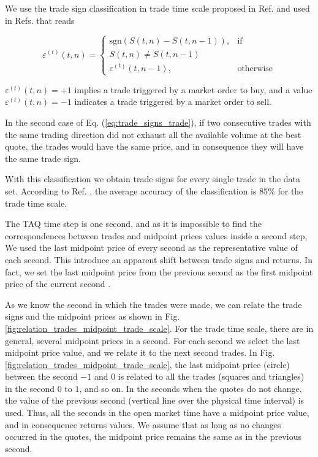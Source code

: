 We use the trade sign classification in trade time scale proposed in Ref.
\cite{Wang_2016_cross} and used in Refs.
\cite{Wang_2017,Wang_2018_copulas,Wang_2016_avg} that reads

\begin{equation}\label{eq:trade_signs_trade}
    \varepsilon^{\left(t\right)}\left(t,n\right)=\left\{
    \begin{array}{cc}
    \text{sgn}\left(S\left(t,n\right)-S\left(t,n-1\right)\right),
    & \text{if }\\ S\left(t,n\right) \ne S\left(t,n-1\right)\\
    \varepsilon^{\left(t\right)}\left(t,n-1\right),
    & \text{otherwise}
    \end{array}\right.
\end{equation}

$\varepsilon^{\left(t\right)}\left( t,n \right) = +1$ implies a trade triggered
by a market order to buy, and a value
$\varepsilon^{\left(t\right)}\left( t,n \right) = -1$ indicates a trade
triggered by a market order to sell.

In the second case of Eq. (\ref{eq:trade_signs_trade}), if two consecutive
trades with the same trading direction did not exhaust all the available volume
at the best quote, the trades would have the same price, and in consequence
they will have the same trade sign.

With this classification we obtain trade signs for every single trade in the
data set. According to Ref. \cite{Wang_2016_cross}, the average accuracy of the
classification is $85\%$ for the trade time scale.

The TAQ time step is one second, and as it is impossible to find the
correspondences between trades and midpoint prices values inside a second step,
We used the last midpoint price of every second as the representative value of
each second. This introduce an apparent shift between trade signs and returns.
In fact, we set the last midpoint price from the previous second as the first
midpoint price of the current second \cite{Wang_2016_cross}.

As we know the second in which the trades were made, we can relate the trade
signs and the midpoint prices as shown in Fig.
\ref{fig:relation_trades_midpoint_trade_scale}. For the trade time scale, there
are in general, several midpoint prices in a second. For each second we select
the last midpoint price value, and we relate it to the next second trades. In
Fig. \ref{fig:relation_trades_midpoint_trade_scale}, the last midpoint price
(circle) between the second $-1$ and $0$ is related to all the trades (squares
and triangles) in the second $0$ to $1$, and so on. In the seconds when the
quotes do not change, the value of the previous second (vertical line over the
physical time interval) is used. Thus, all the seconds in the open market time
have a midpoint price value, and in consequence returns values. We assume that
as long as no changes occurred in the quotes, the midpoint price remains the
same as in the previous second.

